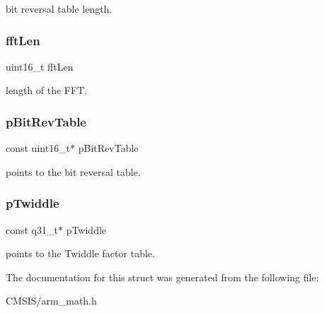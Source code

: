 bit reversal table length. \mbox{\label{structarm__cfft__instance__q31_ab8db3bbe7c61e6bb8ca2a55e3446e11a}} 
\subsubsection{\texorpdfstring{fftLen}{fftLen}}
{\footnotesize\ttfamily uint16\+\_\+t fft\+Len}

length of the F\+FT. \mbox{\label{structarm__cfft__instance__q31_a3b229432d381b0a511a9cdbe3aa74e78}} 
\subsubsection{\texorpdfstring{pBitRevTable}{pBitRevTable}}
{\footnotesize\ttfamily const uint16\+\_\+t$\ast$ p\+Bit\+Rev\+Table}

points to the bit reversal table. \mbox{\label{structarm__cfft__instance__q31_a9760c603af5d85652496dbffd63a8a2e}} 
\subsubsection{\texorpdfstring{pTwiddle}{pTwiddle}}
{\footnotesize\ttfamily const q31\+\_\+t$\ast$ p\+Twiddle}

points to the Twiddle factor table. 

The documentation for this struct was generated from the following file\+:\begin{DoxyCompactItemize}
\item 
C\+M\+S\+I\+S/arm\+\_\+math.\+h\end{DoxyCompactItemize}
